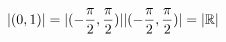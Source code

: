 \documentclass[preview]{standalone}
\begin{document}
\begin{align*}
|(0, 1)| = |(-\frac{\pi}{2}, \frac{\pi}{2})| \newline |(-\frac{\pi}{2}, \frac{\pi}{2})| = |\mathbb R|
\end{align*}
\end{document}
